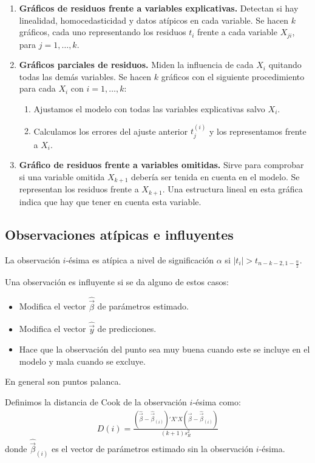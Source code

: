 \begin{enumerate}
\begin{figure}[H]
          \end{figure}
    \item \textbf{Gráficos de residuos frente a variables explicativas.}
          Detectan si hay linealidad, homocedasticidad y datos atípicos en cada variable.
          Se hacen $k$ gráficos, cada uno representando los residuos $t_i$ frente a cada variable $X_{ji}$, para $j = 1, \dots, k$.
    \item \textbf{Gráficos parciales de residuos.}
          Miden la influencia de cada $X_i$ quitando todas las demás variables.
          Se hacen $k$ gráficos con el siguiente procedimiento para cada $X_i$ con $i = 1, \dots, k$:
          \begin{enumerate}
              \item Ajustamos el modelo con todas las variables explicativas salvo $X_i$.
              \item Calculamos los errores del ajuste anterior $t_j^{(i)}$ y los representamos frente a $X_i$.
          \end{enumerate}
    \item \textbf{Gráfico de residuos frente a variables omitidas.}
          Sirve para comprobar si una variable omitida $X_{k+1}$ debería ser tenida en cuenta en el modelo.
          Se representan los residuos frente a $X_{k+1}$.
          Una estructura lineal en esta gráfica indica que hay que tener en cuenta esta variable.
\end{enumerate}

\subsection{Observaciones atípicas e influyentes}

La observación $i$-ésima es atípica a nivel de significación $\alpha$ si $|t_i| > t_{n-k-2, 1-\frac{\alpha}{2}}$.

Una observación es influyente si se da alguno de estos casos:
\begin{itemize}
    \item Modifica el vector $\widehat{\vec{\beta}}$ de parámetros estimado.
    \item Modifica el vector $\widehat{\vec{y}}$ de predicciones.
    \item Hace que la observación del punto sea muy buena cuando este se incluye en el modelo y mala cuando se excluye.
\end{itemize}
En general son puntos palanca.

Definimos la distancia de Cook de la observación $i$-ésima como:
\begin{align*}
    \boxed{
        D(i) =  \frac{(\widehat{\vec{\beta}}-\widehat{\vec{\beta}}_{(i)})'X'X(\widehat{\vec{\beta}}-\widehat{\vec{\beta}}_{(i)})}{(k+1)s_R^2}
    }
\end{align*}
donde $\widehat{\vec{\beta}}_{(i)}$ es el vector de parámetros estimado sin la observación $i$-ésima.

